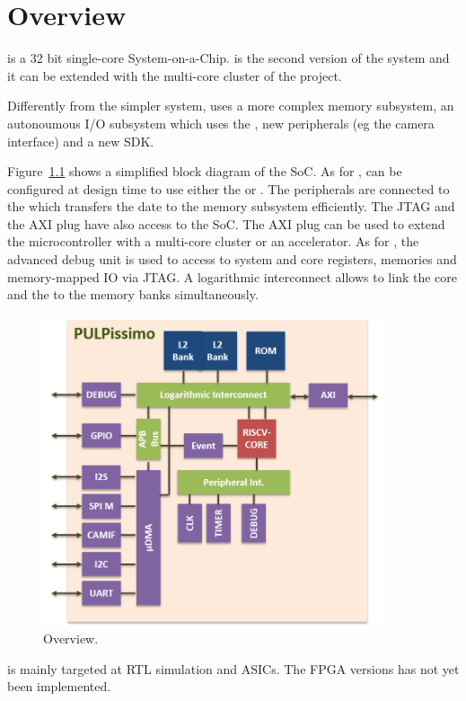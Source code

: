 \chapter{Overview}

\pulpissimo is a 32 bit \riscv single-core System-on-a-Chip.
\pulpissimo is the second version of the \pulpino system and it can be extended
with the multi-core cluster of the \pulp project.

Differently from the simpler \pulpino system, \pulpissimo uses
a more complex memory subsystem, an autonoumous I/O subsystem which uses the \udma, new peripherals (eg the camera interface) and a new SDK.

Figure~\ref{fig:pulpissimo_overview} shows a simplified block diagram of the SoC.
As for \pulpino, \pulpissimo can be configured at design time to use either the \riscy or
\zeroriscy.
The peripherals are connected to the \udma which transfers the date to the memory subsystem efficiently. The JTAG and the AXI plug have also access to the SoC.
The AXI plug can be used to extend the microcontroller with a multi-core cluster or an accelerator.
As for \pulpino, the advanced debug unit is used to access to system and core registers, memories and memory-mapped IO via JTAG.
A logarithmic interconnect allows to link the core and the \udma to the memory banks simultaneously.

\begin{figure}[H]
  \centering
  \includegraphics[width=0.9\textwidth]{./figures/pulpissimo_block.png}
  \caption{\pulpissimo Overview.}
  \label{fig:pulpissimo_overview}
\end{figure}


\pulpissimo is mainly targeted at RTL simulation and ASICs.
The FPGA versions has not yet been implemented.
